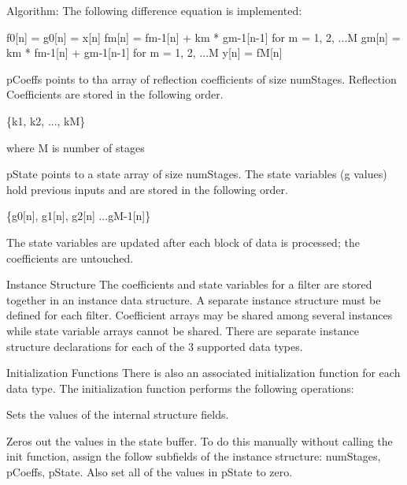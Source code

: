 \begin{DoxyParagraph}{Algorithm\+:}
 The following difference equation is implemented\+: 
\begin{DoxyPre}
     f0[n] = g0[n] = x[n]
     fm[n] = fm-1[n] + km * gm-1[n-1] for m = 1, 2, ...M
     gm[n] = km * fm-1[n] + gm-1[n-1] for m = 1, 2, ...M
     y[n] = fM[n]
  \end{DoxyPre}
 
\end{DoxyParagraph}
\begin{DoxyParagraph}{}
{\ttfamily p\+Coeffs} points to tha array of reflection coefficients of size {\ttfamily num\+Stages}. Reflection Coefficients are stored in the following order. 
\end{DoxyParagraph}
\begin{DoxyParagraph}{}

\begin{DoxyPre}
     \{k1, k2, ..., kM\}
  \end{DoxyPre}
 where M is number of stages 
\end{DoxyParagraph}
\begin{DoxyParagraph}{}
{\ttfamily p\+State} points to a state array of size {\ttfamily num\+Stages}. The state variables (g values) hold previous inputs and are stored in the following order. 
\begin{DoxyPre}
     \{g0[n], g1[n], g2[n] ...gM-1[n]\}
  \end{DoxyPre}
 The state variables are updated after each block of data is processed; the coefficients are untouched. 
\end{DoxyParagraph}
\begin{DoxyParagraph}{Instance Structure}
The coefficients and state variables for a filter are stored together in an instance data structure. A separate instance structure must be defined for each filter. Coefficient arrays may be shared among several instances while state variable arrays cannot be shared. There are separate instance structure declarations for each of the 3 supported data types.
\end{DoxyParagraph}
\begin{DoxyParagraph}{Initialization Functions}
There is also an associated initialization function for each data type. The initialization function performs the following operations\+:
\begin{DoxyItemize}
\item Sets the values of the internal structure fields.
\item Zeros out the values in the state buffer. To do this manually without calling the init function, assign the follow subfields of the instance structure\+: num\+Stages, p\+Coeffs, p\+State. Also set all of the values in p\+State to zero.
\end{DoxyItemize}
\end{DoxyParagraph}
